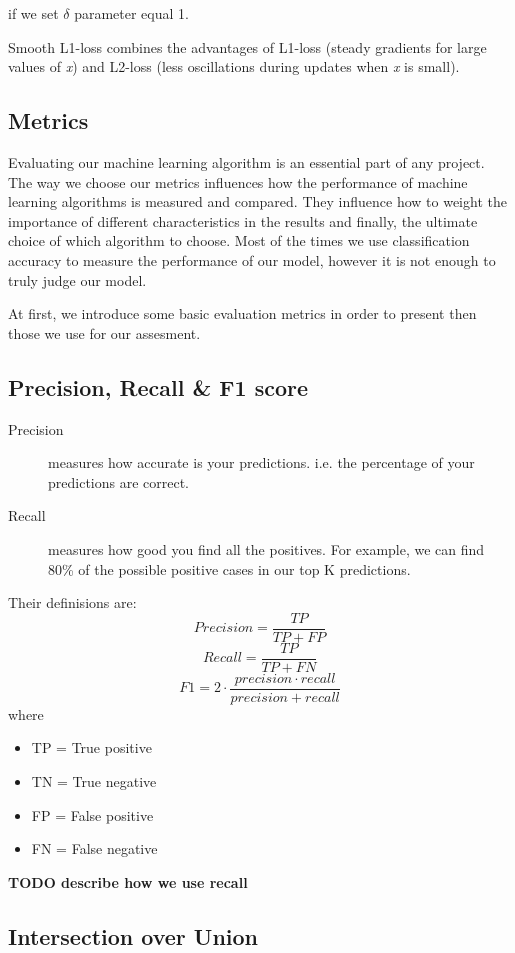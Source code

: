 \documentclass{report}
\begin{document}
if we set $\delta $ parameter equal 1. \par

Smooth L1-loss combines the advantages of L1-loss (steady gradients for large values of \textit{x}) and L2-loss (less oscillations during
updates when \textit{x} is small). 

\subsection{Metrics}
Evaluating our machine learning algorithm is an essential part of any project. The way we choose our metrics influences how the performance
of machine learning algorithms is measured and compared.
They influence how to weight the importance of different characteristics in the results and finally,
the ultimate choice of which algorithm to choose. Most of the times we use classification accuracy
to measure the performance of our model, however it is not enough to truly judge our model. \par
At first, we introduce some basic evaluation metrics in order to present then those we use for our assesment.

\subsection{Precision, Recall \& F1 score}

\begin{description}
\item[ Precision ]  measures how accurate is your predictions. i.e. the percentage of your predictions are correct.
\item[ Recall ] measures how good you find all the positives. For example, we can find 80\% of the possible positive cases in our top K predictions.
\end{description}
Their definisions are:
\[ Precision = \frac{TP}{TP + FP} \]  
\[  Recall = \frac{TP}{TP + FN} \] 
\[ F1 = 2 \cdot \frac{precision \cdot recall}{precision + recall} \]
where \begin{itemize}
\item TP = True positive
\item TN = True negative
\item FP = False positive
\item FN = False negative
\end{itemize}

\textbf{TODO describe how we use recall}

\subsection{Intersection over Union}
\end{document}
